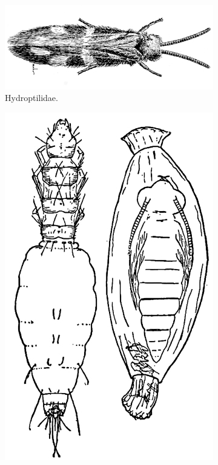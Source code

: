 \documentclass[letterpaper, 11pt]{article}
\begin{document}
\begin{figure}[ht!]
    \centering
    \begin{subfigure}[ht!]{0.65\textwidth}
        \includegraphics[width=\textwidth]{hydroptilidHabitus.png}
        \caption{Hydroptilidae. \citep[modified from Fig. 540 in][]{bhl50956}}
        \label{fig:hydrop1}
    \end{subfigure}
    \hfill %
    \begin{subfigure}[ht!]{0.3\textwidth}
        \includegraphics[width=\textwidth]{hydroptilidaeLarva.png}

\end{subfigure}
\end{figure}
\end{document}

